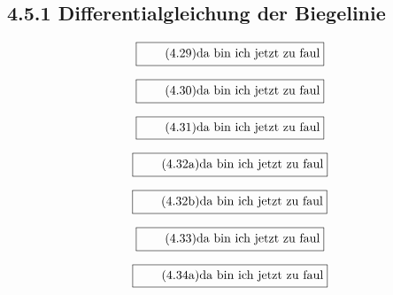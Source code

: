 \documentclass[11pt]{article}
\newcommand{\1}{ {\mathds{1}} }
\begin{document}
    \subsection*{4.5.1 Differentialgleichung der Biegelinie}

    \begin{equation}
      \boxed{
        \tag{4.29}
        \begin{split}
          \text{da bin ich jetzt zu faul}
        \end{split}
      }
    \end{equation}

    \begin{equation}
      \boxed{
        \tag{4.30}
        \begin{split}
          \text{da bin ich jetzt zu faul}
        \end{split}
      }
    \end{equation}

    \begin{equation}
      \boxed{
        \tag{4.31}
        \begin{split}
          \text{da bin ich jetzt zu faul}
        \end{split}
      }
    \end{equation}

    \begin{equation}
      \boxed{
        \tag{4.32a}
        \begin{split}
          \text{da bin ich jetzt zu faul}
        \end{split}
      }
    \end{equation}

    \begin{equation}
      \boxed{
        \tag{4.32b}
        \begin{split}
          \text{da bin ich jetzt zu faul}
        \end{split}
      }
    \end{equation}
    
    \begin{equation}
      \boxed{
        \tag{4.33}
        \begin{split}
          \text{da bin ich jetzt zu faul}
        \end{split}
      }
    \end{equation}

    \begin{equation}
      \boxed{
        \tag{4.34a}
        \begin{split}
          \text{da bin ich jetzt zu faul}
        \end{split}
      }
    \end{equation}
\end{document}
